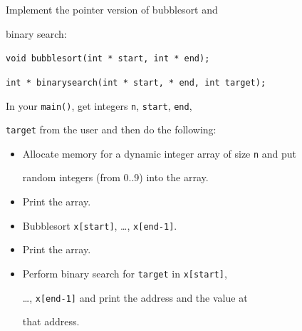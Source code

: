 Implement the pointer version of bubblesort and

binary search:



\verb!void bubblesort(int * start, int * end);!



\verb!int * binarysearch(int * start, * end, int target);!



In your \texttt{main()}, get integers \texttt{n}, \texttt{start}, \texttt{end},

\texttt{target} from the user and then do the following:



\begin{itemize}

\item

  Allocate memory for a dynamic integer array of size \texttt{n} and put

  random integers (from 0..9) into the array.

\item

  Print the array.

\item

  Bubblesort \texttt{x[start]}, \ldots, \texttt{x[end-1]}.

\item

  Print the array.

\item

  Perform binary search for \texttt{target} in \texttt{x[start]},

  \ldots, \texttt{x[end-1]} and print the address and the value at

  that address.

\end{itemize}

